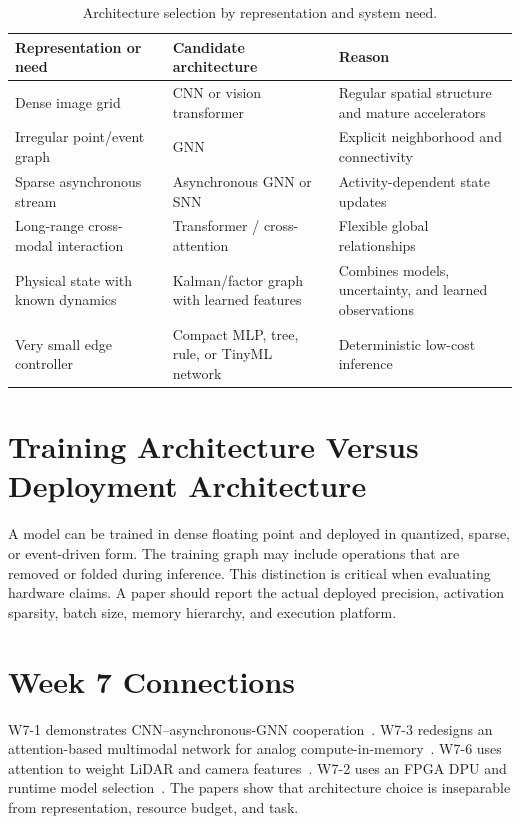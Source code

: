 \begin{table}[H]
\centering
\caption{Architecture selection by representation and system need.}
\label{tab:architecture-selection}
\begin{tabularx}{\textwidth}{@{}p{3.0cm}p{3.5cm}X@{}}
\toprule
\textbf{Representation or need} & \textbf{Candidate architecture} & \textbf{Reason} \\
\midrule
Dense image grid & CNN or vision transformer & Regular spatial structure and mature accelerators \\
Irregular point/event graph & GNN & Explicit neighborhood and connectivity \\
Sparse asynchronous stream & Asynchronous GNN or SNN & Activity-dependent state updates \\
Long-range cross-modal interaction & Transformer / cross-attention & Flexible global relationships \\
Physical state with known dynamics & Kalman/factor graph with learned features & Combines models, uncertainty, and learned observations \\
Very small edge controller & Compact MLP, tree, rule, or TinyML network & Deterministic low-cost inference \\
\bottomrule
\end{tabularx}
\end{table}

\section{Training Architecture Versus Deployment Architecture}

A model can be trained in dense floating point and deployed in quantized, sparse, or event-driven form. The training graph may include operations that are removed or folded during inference. This distinction is critical when evaluating hardware claims. A paper should report the actual deployed precision, activation sparsity, batch size, memory hierarchy, and execution platform.

\section{Week 7 Connections}

W7-1 demonstrates CNN--asynchronous-GNN cooperation~\cite{gehrig2024lowlatency}. W7-3 redesigns an attention-based multimodal network for analog compute-in-memory~\cite{ichikawa2024remcim}. W7-6 uses attention to weight LiDAR and camera features~\cite{zhang2026pentafusion}. W7-2 uses an FPGA DPU and runtime model selection~\cite{zhang2023carma}. The papers show that architecture choice is inseparable from representation, resource budget, and task.

